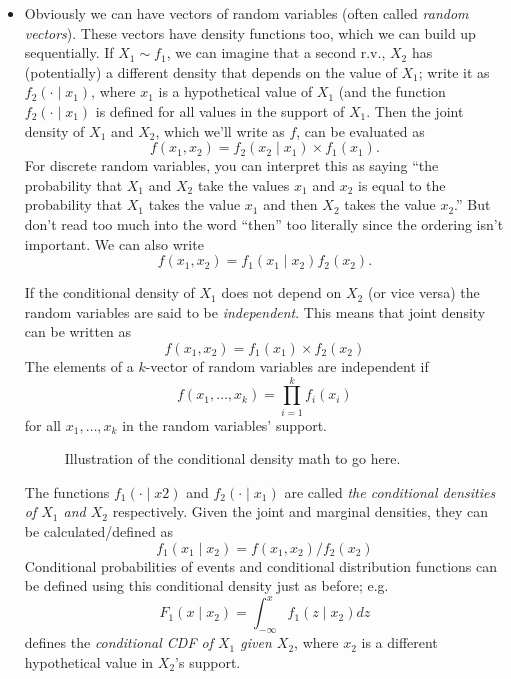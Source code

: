\begin{itemize}[leftmargin=0pt]
\item Obviously we can have vectors of random variables (often called
  \emph{random vectors}).  These vectors have density functions too,
  which we can build up sequentially.  If $X_1 \sim f_1$, we can
  imagine that a second r.v., $X_2$ has (potentially) a different
  density that depends on the value of $X_1$; write it as $f_2(\cdot
  \mid x_1)$, where $x_1$ is a hypothetical value of $X_1$ (and the
  function $f_2(\cdot \mid x_1)$ is defined for all values in the
  support of $X_1$.  Then the joint density of $X_1$ and $X_2$, which
  we'll write as $f$, can be evaluated as
  \begin{equation}\label{p2}
    f(x_1,x_2) = f_2(x_2 \mid x_1) \times f_1(x_1).
  \end{equation}
  For discrete random variables, you can interpret this as saying
  ``the probability that $X_1$ and $X_2$ take the values $x_1$ and $x_2$
  is equal to the probability that $X_1$ takes the value $x_1$ and then
  $X_2$ takes the value $x_2$.''  But don't read too much into the word
  ``then'' too literally since the ordering isn't important.  We can
  also write
  \begin{equation}
    f(x_1,x_2) = f_1(x_1 \mid x_2) f_2(x_2).
  \end{equation}

  If the conditional density of $X_1$ does not depend on $X_2$ (or vice
  versa) the random variables are said to be \emph{independent}.  This
  means that joint density can be written as
  \begin{equation*}
    f(x_1,x_2) = f_1(x_1) \times f_2(x_2)
  \end{equation*}
  The elements of a $k$-vector of random variables are independent if
  \begin{equation*}
    f(x_1,\dots,x_k) = \prod_{i=1}^k f_i(x_i)
  \end{equation*}
  for all $x_1,\dots,x_k$ in the random variables' support.

\begin{figure}[t]
  [Empty for now.  Sometime soon, I'll add a figure.]
  \caption{Illustration of the conditional density math to go here.}
\end{figure}

  The functions $f_1(\cdot \mid x2)$ and $f_2(\cdot \mid x_1)$ are called \emph{the
  conditional densities of $X_1$ and $X_2$} respectively.  Given the
  joint and marginal densities, they can be calculated/defined as
  \begin{equation*}
    f_1(x_1 \mid x_2) = f(x_1, x_2) / f_2(x_2)
  \end{equation*}
  Conditional probabilities of events and conditional distribution
  functions can be defined using this conditional density just as
  before; e.g.
  \begin{equation*}
    F_1(x \mid x_2) = \int_{-\infty}^x f_1(z \mid x_2) dz
  \end{equation*}
  defines the \emph{conditional CDF of $X_1$ given $X_2$}, where $x_2$ is
  a different hypothetical value in $X_2$'s support.


\end{itemize}
